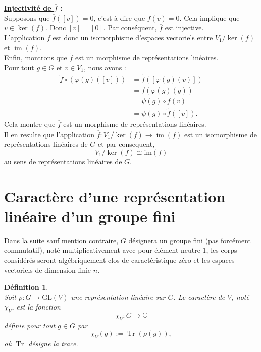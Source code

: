 \documentclass[a4paper, 14pt]{report}
\newtheorem{definition}{Définition}[section]
\begin{document}
\begin{onehalfspace}
{			\textbf{\underline{Injectivité de \( \overline{f} \)} :}\\
			Supposons que \( \overline{f}([v]) = 0 \), c'est-à-dire que \( f(v) = 0 \). Cela implique que \( v \in \ker(f) \). Donc \( [v] = [0] \). Par conséquent, \( \overline{f} \) est injective.\\
			L'application \( \overline{f} \) est donc un isomorphisme d'espaces vectoriels entre \( V_1 / \ker(f) \) et \( \operatorname{im}(f) \).\\
			Enfin, montrons que $\tilde{f}$ est un morphisme de représentations linéaires. \\
			Pour tout $g \in G$ et $v \in V_1$, nous avons :
			\[
			\begin{aligned}
				\tilde{f} \circ (\varphi(g) ([v])) &= \tilde{f}([\varphi(g) (v)])\\
				&= f(\varphi(g) (g)) \\
				&= \psi(g) \circ f(v) \\
				&= \psi(g) \circ\tilde{f}([v]).
			\end{aligned}
			\]
			Cela montre que \( \overline{f} \) est un morphisme de représentations linéaires.\\
			Il en resulte que l'application \( \overline{f} : V_1 / \ker(f) \to \operatorname{im}(f) \) est un isomorphisme de représentations linéaires de \( G \) et par consequent,
			\[ V_1 / \ker(f) \cong \mathrm{im}(f) \] 
			au sens de représentations linéaires de \(G\).	
			
			
			
			
			\section{Caractère d'une représentation linéaire d'un groupe fini}
			Dans la suite sauf mention contraire, \( G \) désignera un groupe fini (pas forcément commutatif), noté multiplicativement avec pour élément neutre \( 1 \), les corps considérés seront algébriquement clos de caractéristique zéro et les espaces vectoriels de dimension finie $n$.
			
			\begin{definition} \cite{serre1971representation} \\
				Soit \(\rho : G \rightarrow \mathrm{GL}(V)\) une représentation linéaire sur \( G \). Le caractère de \( V \), noté \( \chi_V \), est la fonction 
				\[
				\chi_V : G \to \mathbb{C}
				\]
				définie pour tout \( g \in G \) par
				\[
				\chi_V(g) := \operatorname{Tr}(\rho(g)),
				\]
				où \( \operatorname{Tr} \) désigne la trace.
			\end{definition}
			
}
\end{onehalfspace}
\end{document}
